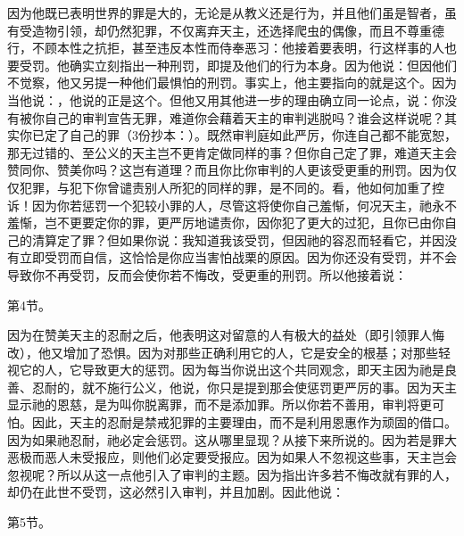 因为他既已表明世界的罪是大的，无论是从教义还是行为，并且他们虽是智者，虽有受造物引领，却仍然犯罪，不仅离弃天主，还选择爬虫的偶像，而且不尊重德行，不顾本性之抗拒，甚至违反本性而侍奉恶习：他接着要表明，行这样事的人也要受罚。他确实立刻指出一种刑罚，即提及他们的行为本身。因为他说：但因他们不觉察，他又另提一种他们最惧怕的刑罚。事实上，他主要指向的就是这个。因为当他说：，他说的正是这个。但他又用其他进一步的理由确立同一论点，说：你没有被你自己的审判宣告无罪，难道你会藉着天主的审判逃脱吗？谁会这样说呢？其实你已定了自己的罪（3份抄本：）。既然审判庭如此严厉，你连自己都不能宽恕，那无过错的、至公义的天主岂不更肯定做同样的事？但你自己定了罪，难道天主会赞同你、赞美你吗？这岂有道理？而且你比你审判的人更该受更重的刑罚。因为仅仅犯罪，与犯下你曾谴责别人所犯的同样的罪，是不同的。看，他如何加重了控诉！因为你若惩罚一个犯较小罪的人，尽管这将使你自己羞惭，何况天主，祂永不羞惭，岂不更要定你的罪，更严厉地谴责你，因你犯了更大的过犯，且你已由你自己的清算定了罪？但如果你说：我知道我该受罚，但因祂的容忍而轻看它，并因没有立即受罚而自信，这恰恰是你应当害怕战栗的原因。因为你还没有受罚，并不会导致你不再受罚，反而会使你若不悔改，受更重的刑罚。所以他接着说：\par

第4节。\par

因为在赞美天主的忍耐之后，他表明这对留意的人有极大的益处（即引领罪人悔改），他又增加了恐惧。因为对那些正确利用它的人，它是安全的根基；对那些轻视它的人，它导致更大的惩罚。因为每当你说出这个共同观念，即天主因为祂是良善、忍耐的，就不施行公义，他说，你只是提到那会使惩罚更严厉的事。因为天主显示祂的恩慈，是为叫你脱离罪，而不是添加罪。所以你若不善用，审判将更可怕。因此，天主的忍耐是禁戒犯罪的主要理由，而不是利用恩惠作为顽固的借口。因为如果祂忍耐，祂必定会惩罚。这从哪里显现？从接下来所说的。因为若是罪大恶极而恶人未受报应，则他们必定要受报应。因为如果人不忽视这些事，天主岂会忽视呢？所以从这一点他引入了审判的主题。因为指出许多若不悔改就有罪的人，却仍在此世不受罚，这必然引入审判，并且加剧。因此他说：\par

第5节。\par

